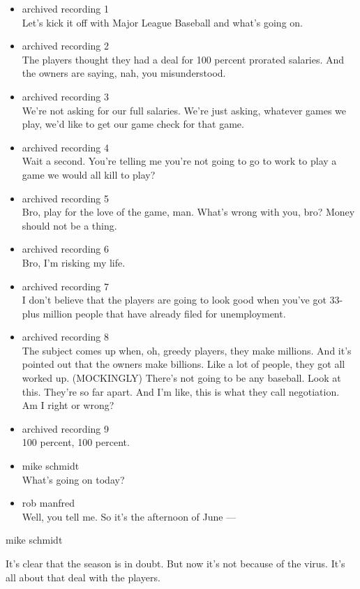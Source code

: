 \begin{itemize}
\item
  archived recording 1\\
  Let's kick it off with Major League Baseball and what's going on.
\item
  archived recording 2\\
  The players thought they had a deal for 100 percent prorated salaries.
  And the owners are saying, nah, you misunderstood.
\item
  archived recording 3\\
  We're not asking for our full salaries. We're just asking, whatever
  games we play, we'd like to get our game check for that game.
\item
  archived recording 4\\
  Wait a second. You're telling me you're not going to go to work to
  play a game we would all kill to play?
\item
  archived recording 5\\
  Bro, play for the love of the game, man. What's wrong with you, bro?
  Money should not be a thing.
\item
  archived recording 6\\
  Bro, I'm risking my life.
\item
  archived recording 7\\
  I don't believe that the players are going to look good when you've
  got 33-plus million people that have already filed for unemployment.
\item
  archived recording 8\\
  The subject comes up when, oh, greedy players, they make millions. And
  it's pointed out that the owners make billions. Like a lot of people,
  they got all worked up. (MOCKINGLY) There's not going to be any
  baseball. Look at this. They're so far apart. And I'm like, this is
  what they call negotiation. Am I right or wrong?
\item
  archived recording 9\\
  100 percent, 100 percent.
\item
  mike schmidt\\
  What's going on today?
\item
  rob manfred\\
  Well, you tell me. So it's the afternoon of June ---
\end{itemize}

mike schmidt

It's clear that the season is in doubt. But now it's not because of the
virus. It's all about that deal with the players.

